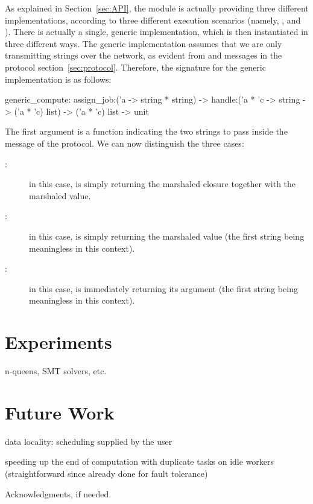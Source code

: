 \documentclass[preprint]{sigplanconf}
\begin{document}
As explained in Section~\ref{sec:API}, the  module is
actually providing three different implementations, according to three
different execution scenarios (namely, ,  and
). There is actually a single, generic implementation, which
is then instantiated in three different ways.
The generic implementation assumes that we are only transmitting
strings over the network, as evident from  and
 messages in the protocol section~\ref{sec:protocol}.
Therefore, the signature for the generic implementation is as follows:
\begin{ocaml}
  generic_compute:
    assign_job:('a -> string * string) ->
    handle:('a * 'c -> string -> ('a * 'c) list)  ->
    ('a * 'c) list -> unit
\end{ocaml}
The first argument  is a function indicating 
the two strings to pass inside the  message of the protocol.
We can now distinguish the three cases:
\begin{description}
\item[:] in this case,  is simply returning
  the marshaled closure together with the marshaled value.
\item[:] in this case,  is simply
  returning the marshaled value (the first string being meaningless in
  this context).
\item[:] in this case,  is immediately
  returning its argument (the first string being meaningless in
  this context).
\end{description}

\section{Experiments}\label{sec:experiments}

n-queens, SMT solvers, etc.

\section{Future Work}\label{sec:future}

data locality: scheduling supplied by the user

speeding up the end of computation with duplicate tasks on idle workers
(straightforward since already done for fault tolerance)



\acks

Acknowledgments, if needed.


\nocite{*}


\end{document}
